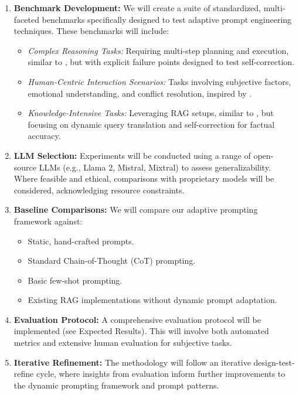 \documentclass{article}
\begin{document}
\begin{enumerate}
    \item \textbf{Benchmark Development:} We will create a suite of standardized, multi-faceted benchmarks specifically designed to test adaptive prompt engineering techniques. These benchmarks will include:
    \begin{itemize}
        \item \textit{Complex Reasoning Tasks:} Requiring multi-step planning and execution, similar to \cite{paper1_agents}, but with explicit failure points designed to test self-correction.
        \item \textit{Human-Centric Interaction Scenarios:} Tasks involving subjective factors, emotional understanding, and conflict resolution, inspired by \cite{paper2_requirements}.
        \item \textit{Knowledge-Intensive Tasks:} Leveraging RAG setups, similar to \cite{paper5_legalrag}, but focusing on dynamic query translation and self-correction for factual accuracy.
    \end{itemize}
    \item \textbf{LLM Selection:} Experiments will be conducted using a range of open-source LLMs (e.g., Llama 2, Mistral, Mixtral) to assess generalizability. Where feasible and ethical, comparisons with proprietary models will be considered, acknowledging resource constraints.
    \item \textbf{Baseline Comparisons:} We will compare our adaptive prompting framework against:
    \begin{itemize}
        \item Static, hand-crafted prompts.
        \item Standard Chain-of-Thought (CoT) prompting.
        \item Basic few-shot prompting.
        \item Existing RAG implementations without dynamic prompt adaptation.
    \end{itemize}
    \item \textbf{Evaluation Protocol:} A comprehensive evaluation protocol will be implemented (see Expected Results). This will involve both automated metrics and extensive human evaluation for subjective tasks.
    \item \textbf{Iterative Refinement:} The methodology will follow an iterative design-test-refine cycle, where insights from evaluation inform further improvements to the dynamic prompting framework and prompt patterns.
\end{enumerate}
\end{document}
